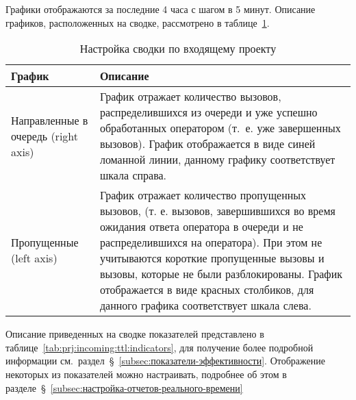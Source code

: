 Графики отображаются за последние 4 часа с шагом в 5 минут.
Описание графиков, расположенных на сводке, рассмотрено в таблице~\ref{tab:prj:incoming:ttl:charts}.

\begin{table}[ht]
    \caption{Настройка сводки по входящему проекту}
    \begin{small}
        \begin{tabular}{|p{}|p{}|}
            \hline
            График & Описание \\
            \hline
            Направленные в очередь (right axis) & График отражает количество вызовов, распределившихся из очереди и уже успешно обработанных оператором (т.~е. уже завершенных вызовов). График отображается в виде синей ломанной линии, данному графику соответствует шкала справа.\\
            \hline
            Пропущенные (left axis) & График отражает количество пропущенных вызовов, (т. е. вызовов, завершившихся во время ожидания ответа оператора в очереди и не распределившихся на оператора). При этом не учитываются короткие пропущенные вызовы и вызовы, которые не были разблокированы. График отображается в виде красных столбиков, для данного графика соответствует шкала слева.\\
            \hline
        \end{tabular}
    \end{small}
    \label{tab:prj:incoming:ttl:charts}
\end{table}

Описание приведенных на сводке показателей представлено в таблице~\ref{tab:prj:incoming:ttl:indicators},
для получение более подробной информации см.~раздел~\S~\ref{subsec:показатели-эффективности}.
Отображение некоторых из показателей можно настраивать, подробнее об этом в разделе~\S~\ref{subsec:настройка-отчетов-реального-времени}

